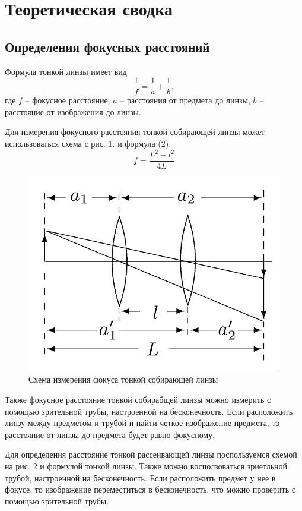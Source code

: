 \documentclass[a4paper,12pt]{article}
\begin{document}
\section*{Теоретическая сводка}
\subsection*{Определения фокусных расстояний}
Формула тонкой линзы имеет вид
\begin{equation}
    \frac{1}{f} = \frac{1}{a} + \frac{1}{b},
\end{equation}
\noindent
где $f$ -- фокусное расстояние, $a$ -- расстояния от предмета до линзы, $b$ -- расстояние от изображения до линзы.

\noindent
Для измерения фокусного расстояния тонкой собирающей линзы может использоваться схема с рис. 1. и формула (2).
\begin{equation}
    f = \frac{L^2 - l^2}{4L}
\end{equation}

\begin{figure}[H]
    \centering
    \includegraphics[scale=0.3]{pic_1.png}
    \caption{Схема измерения фокуса тонкой собирающей линзы}
\end{figure}

\noindent
Также фокусное расстояние тонкой собирабщей линзы можно измерить с помощью зрительной трубы, настроенной на бесконечность. Если расположить линзу между предметом и трубой и найти четкое изображение предмета, то расстояние от линзы до предмета будет равно фокусному.

\noindent
Для определения расстояние тонкой рассеивающей линзы поспользуемся схемой на рис. 2 и формулой тонкой линзы. Также можно восползоваться зриетльной трубой, настроенной на бесконечность. Если расположить предмет у нее в фокусе, то изображение переместиться в бесконечность, что можно проверить с помощью зрительной трубы.
\end{document}
